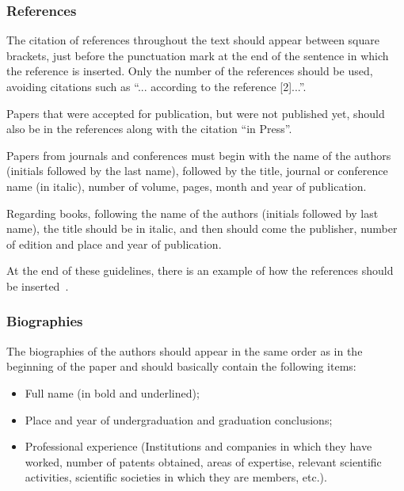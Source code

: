 \documentclass[english]{sobraep}
\begin{document}
\subsubsection{References}

The citation of references throughout the text should appear between square brackets, just before the punctuation mark at the end of the sentence in which the reference is inserted. Only the number of the references should be used, avoiding citations such as ``... according to the reference [2]...''.

Papers that were accepted for publication, but were not published yet, should also be in the references along with the citation ``in Press''.

Papers from journals and conferences must begin with the name of the authors (initials followed by the last name), followed by the title, journal or conference name (in italic), number of volume, pages, month and year of publication. 

Regarding books, following the name of the authors (initials followed by last name), the title should be in italic, and then should come the publisher, number of edition and place and year of publication.

At the end of these guidelines, there is an example of how the references should be inserted~\cite{refbib1,refbib2,refbib3,refbib4,refbib5,refbib6,refbib7,refbib8}.







\subsubsection{Biographies}

The biographies of the authors should appear in the same order as in the beginning of the paper and should basically contain the following items:
\begin{itemize}
	\item Full name (in bold and underlined);
	\item Place and year of undergraduation and graduation conclusions;
	\item Professional experience (Institutions and companies in which they have worked, number of patents obtained, areas of expertise, relevant scientific activities, scientific societies in which they are members, etc.). \newline
\end{itemize}
\end{document}

